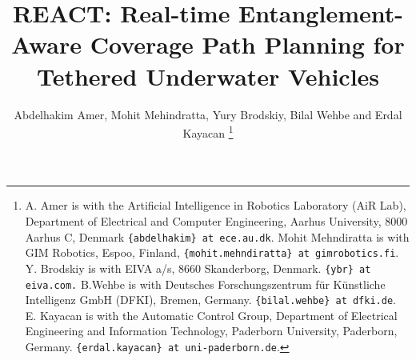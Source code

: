 \documentclass[letterpaper, 10 pt, conference]{ieeetran}  %
\begin{document}
%
\title{REACT: Real-time Entanglement-Aware Coverage Path Planning for Tethered Underwater Vehicles}

\author{Abdelhakim Amer, Mohit Mehindratta, Yury Brodskiy, Bilal Wehbe and Erdal Kayacan
\thanks{A. Amer is with the Artificial Intelligence in Robotics Laboratory (AiR Lab), Department of Electrical and Computer Engineering, Aarhus University, 8000 Aarhus C, Denmark {\tt\small \{abdelhakim\} at ece.au.dk}.    Mohit Mehndiratta is with GIM Robotics, Espoo, Finland, {\tt\small \{mohit.mehndiratta\} at gimrobotics.fi}.
     Y. Brodskiy is with EIVA a/s, 8660 Skanderborg, Denmark. {\tt\small \{ybr\} at eiva.com.}
     B.Wehbe is with Deutsches Forschungszentrum für Künstliche Intelligenz GmbH (DFKI), Bremen, Germany.  {\tt\small \{bilal.wehbe\} at dfki.de}.
    E. Kayacan is with the Automatic Control Group, Department of Electrical Engineering and Information Technology, Paderborn University, Paderborn, Germany. {\tt\small \{erdal.kayacan\} at uni-paderborn.de}.}%
}
\end{document}
